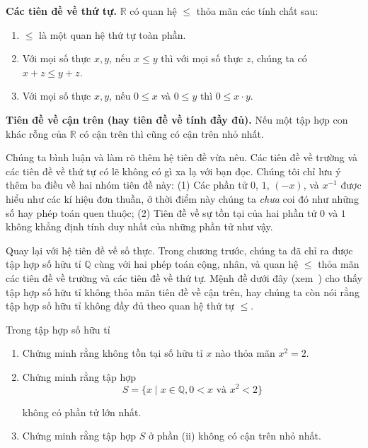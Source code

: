 \begin{axiom}
	\textbf{Các tiên đề về thứ tự.} $\mathbb{R}$ có quan hệ $\leq$ thỏa mãn các tính chất sau:
	\begin{enumerate}[label={(\roman*)}]
		\item $\leq$ là một quan hệ thứ tự toàn phần.
		\item Với mọi số thực $x, y$, nếu $x\leq y$ thì với mọi số thực $z$, chúng ta có $x + z\leq y + z$.
		\item Với mọi số thực $x, y$, nếu $0\leq x$ và $0\leq y$ thì $0\leq x\cdot y$.
	\end{enumerate}

	\textbf{Tiên đề về cận trên (hay tiên đề về tính đầy đủ).} Nếu một tập hợp con khác rỗng của $\mathbb{R}$ có cận trên thì cũng có cận trên nhỏ nhất.
\end{axiom}

Chúng ta bình luận và làm rõ thêm hệ tiên đề vừa nêu. Các tiên đề về trường và các tiên đề về thứ tự có lẽ không có gì xa lạ với bạn đọc. Chúng tôi chỉ lưu ý thêm ba điều về hai nhóm tiên đề này: (1) Các phần tử $0$, $1$, $(-x)$, và $x^{-1}$ được hiểu như các kí hiệu đơn thuần, ở thời điểm này chúng ta \textit{chưa} coi đó như những số hay phép toán quen thuộc; (2) Tiên đề về sự tồn tại của hai phần tử $0$ và $1$ không khẳng định tính duy nhất của những phần tử như vậy.

Quay lại với hệ tiên đề về số thực. Trong chương trước, chúng ta đã chỉ ra được tập hợp số hữu tỉ $\mathbb{Q}$ cùng với hai phép toán cộng, nhân, và quan hệ $\leq$ thỏa mãn các tiên đề về trường và các tiên đề về thứ tự. Mệnh đề dưới đây (xem~\cite{spivak}) cho thấy tập hợp số hữu tỉ không thỏa mãn tiên đề về cận trên, hay chúng ta còn nói rằng tập hợp số hữu tỉ không đầy đủ theo quan hệ thứ tự $\leq$.

\begin{proposition}\label{proposition:irrational-cut}
	Trong tập hợp số hữu tỉ
	\begin{enumerate}[label={(\roman*)}]
		\item Chứng minh rằng không tồn tại số hữu tỉ $x$ nào thỏa mãn $x^{2} = 2$.
		\item Chứng minh rằng tập hợp
		      \[
			      S = \{ x \mid x\in\mathbb{Q}, 0 < x \text{ và } x^{2} < 2 \}
		      \]

		      không có phần tử lớn nhất.
		\item Chứng minh rằng tập hợp $S$ ở phần (ii) không có cận trên nhỏ nhất.
	\end{enumerate}
\end{proposition}

